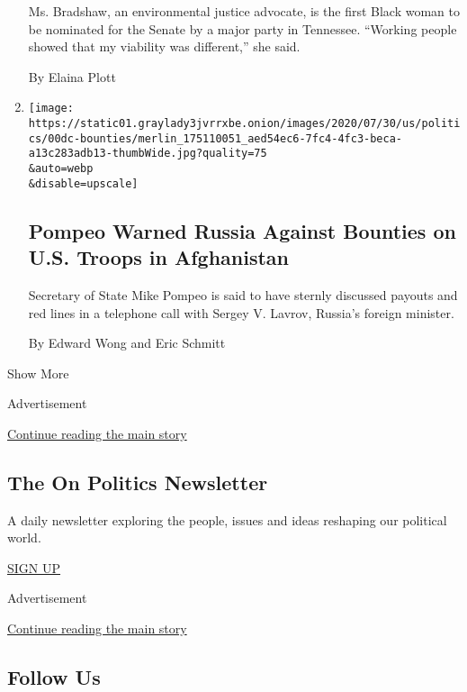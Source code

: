 \begin{enumerate}
  Ms. Bradshaw, an environmental justice advocate, is the first Black
  woman to be nominated for the Senate by a major party in Tennessee.
  ``Working people showed that my viability was different,'' she said.

  By Elaina Plott
\item
  \href{/2020/08/07/world/asia/pompeo-russia-afghanistan-bounties.html}{}

  \texttt{[image: https://static01.graylady3jvrrxbe.onion/images/2020/07/30/us/politics/00dc-bounties/merlin\_175110051\_aed54ec6-7fc4-4fc3-beca-a13c283adb13-thumbWide.jpg?quality=75\\\&auto=webp\\\&disable=upscale]}

  \hypertarget{pompeo-warned-russia-against-bounties-on-us-troops-in-afghanistan}{%
  \subsection{Pompeo Warned Russia Against Bounties on U.S. Troops in
  Afghanistan}\label{pompeo-warned-russia-against-bounties-on-us-troops-in-afghanistan}}

  Secretary of State Mike Pompeo is said to have sternly discussed
  payouts and red lines in a telephone call with Sergey V. Lavrov,
  Russia's foreign minister.

  By Edward Wong and Eric Schmitt
\end{enumerate}

Show More

Advertisement

\protect\hyperlink{after-mid2}{Continue reading the main story}

\hypertarget{the-on-politics-newsletter}{%
\subsection{The On Politics
Newsletter}\label{the-on-politics-newsletter}}

A daily newsletter exploring the people, issues and ideas reshaping our
political world.

\href{/newsletters/signup/CN}{SIGN UP}

Advertisement

\protect\hyperlink{after-mktg}{Continue reading the main story}

\hypertarget{follow-us}{%
\subsection{Follow Us}\label{follow-us}}

